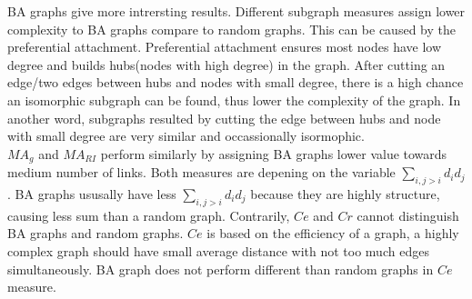 \documentclass[12pt]{article}
\begin{document}
BA graphs give more intrersting results. Different subgraph measures assign lower complexity to BA graphs compare to random graphs. This can be caused by the preferential attachment. Preferential attachment ensures most nodes have low degree and builds hubs(nodes with high degree) in the graph. After cutting an edge/two edges between hubs and nodes with small degree, there is a high chance an isomorphic subgraph can be found, thus lower the complexity of the graph. In another word, subgraphs resulted by cutting the edge between hubs and node with small degree are very similar and occassionally isormophic.\\
$MA_g$ and $MA_{RI}$ perform similarly by assigning BA graphs lower value towards medium number of links. Both measures are depening on the variable $\sum_{i,j>i}d_id_j$. BA graphs ususally have less $\sum_{i,j>i}d_id_j$ because they are highly structure, causing less sum than a random graph. Contrarily, $Ce$ and $Cr$ cannot distinguish BA graphs and random graphs. $Ce$ is based on the efficiency of a graph, a highly complex graph should have small average distance with not too much edges simultaneously. BA graph does not perform different than random graphs in $Ce$ measure.\\
\end{document}
